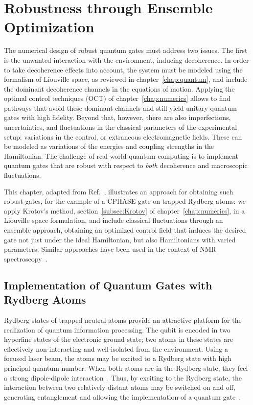 \chapter{Robustness through Ensemble Optimization}
\label{chap:robust}

The numerical design of robust quantum gates must address two issues. The first
is the unwanted interaction with the environment, inducing decoherence.
In order to take decoherence effects into account, the
system must be modeled using the formalism of Liouville space, as
reviewed in chapter~\ref{chap:quantum}, and include the dominant decoherence
channels in the equations of motion.
Applying the optimal control techniques (OCT) of chapter~\ref{chap:numerics}
allows to find pathways that avoid these dominant channels and still yield
unitary quantum gates with high fidelity.
Beyond that, however, there are also imperfections, uncertainties, and
fluctuations in the classical parameters of the experimental setup: variations
in the control, or extraneous electromagnetic fields. These can be modeled
as variations of the energies and coupling strengths in the Hamiltonian. The
challenge of real-world quantum computing is to implement quantum gates that are
robust with respect to \emph{both} decoherence and macroscopic fluctuations.

This chapter, adapted from Ref.~\cite{GoerzPRA2014}, illustrates an approach for
obtaining such robust gates, for the example of a CPHASE gate on trapped Rydberg
atoms: we apply Krotov's method, section~\ref{subsec:Krotov} of
chapter~\ref{chap:numerics}, in a Liouville space formulation, and include
classical fluctuations through an ensemble approach, obtaining an optimized control
field that induces the desired gate not just under the ideal Hamiltonian, but
also Hamiltonians with varied parameters. Similar approaches have been used  in
the context of NMR spectroscopy~\cite{kobzar2004nmr,kobzar2008nmr}.


\section{Implementation of Quantum Gates with Rydberg Atoms}
\label{sec:RydbergImplemenation}

Rydberg states of trapped neutral atoms provide an attractive platform for
the realization of quantum information processing. The qubit is encoded in two
hyperfine states of the electronic ground state; two atoms in these states are
effectively non-interacting and well-isolated from the environment.
Using a focused laser beam, the atoms may be excited to a Rydberg
state with high principal quantum number. When both atoms are in the Rydberg
state, they feel a strong dipole-dipole interaction~\cite{SaffmanRMP2010}.
Thus, by exciting to the Rydberg state, the interaction between two relatively
distant atoms may be switched on and off, generating entanglement and allowing
the implementation of a quantum gate~\cite{WilkPRL10,IsenhowerPRL10}.

